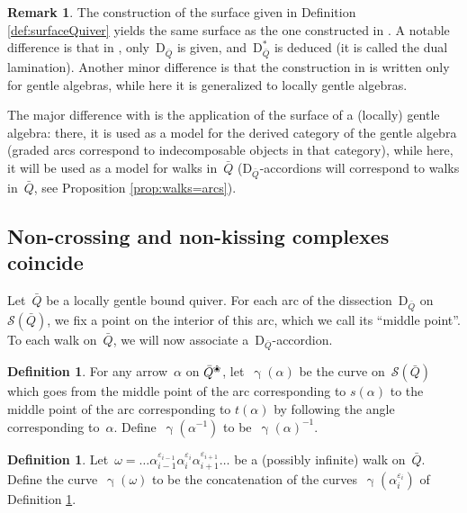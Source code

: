 \documentclass{amsart}
\theoremstyle{definition}
\newtheorem{definition}[theorem]{Definition}
\newtheorem{remark}[theorem]{Remark}
\newcommand{\blossom}{^\text{\ding{96}}} %
\newcommand{\surface}{\mathcal{S}} %
\newcommand{\dual}{^*} %
\newcommand{\dissection}{\mathrm{D}} %
\newcommand{\curveof}{\operatorname{\gamma}} %
\begin{document}
\begin{remark}
\label{rem:comparisonWithOPS}
The construction of the surface given in Definition \ref{def:surfaceQuiver} yields the same surface as the one constructed in \cite{OpperPlamondonSchroll}.
A notable difference is that in \cite{OpperPlamondonSchroll}, only~$\dissection_{\bar Q}$ is given, and~$\dissection_{\bar Q}\dual$ is deduced (it is called the dual lamination).
Another minor difference is that the construction in \cite{OpperPlamondonSchroll} is written only for gentle algebras, while here it is generalized to locally gentle algebras.

The major difference with \cite{OpperPlamondonSchroll} is the application of the surface of a (locally) gentle algebra: 
there, it is used as a model for the derived category of the gentle algebra (graded arcs correspond to indecomposable objects in that category),
while here, it will be used as a model for walks in~$\bar Q$ ($\dissection_{\bar Q}$-accordions will correspond to walks in~$\bar{Q}$, see Proposition \ref{prop:walks=arcs}).
\end{remark}

\subsection{Non-crossing and non-kissing complexes coincide}

Let~$\bar Q$ be a locally gentle bound quiver.
For each arc of the dissection~$\dissection_{\bar Q}$ on~$\surface(\bar Q)$, we fix a point on the interior of this arc, which we call its ``middle point''.
To each walk on~$\bar Q$, we will now associate a~$\dissection_{\bar Q}$-accordion.

\begin{definition}
\label{def:curveOfAnArrow}
For any arrow~$\alpha$ on $\bar Q\blossom$, let~$\curveof(\alpha)$ be the curve on~$\surface(\bar Q)$ which goes from the middle point of the arc corresponding to $s(\alpha)$ to the middle point of the arc corresponding to $t(\alpha)$ by following the angle corresponding to~$\alpha$.
Define~$\curveof(\alpha^{-1})$ to be~$\curveof(\alpha)^{-1}$.
\end{definition}

\begin{definition}
\label{def:curveOfAWalk}
Let~$\omega = \ldots \alpha_{i-1}^{\varepsilon_{i-1}}\alpha_{i}^{\varepsilon_i}\alpha_{i+1}^{\varepsilon_{i+1}} \ldots$ be a (possibly infinite) walk on~$\bar Q$. 
Define the curve~$\curveof(\omega)$ to be the concatenation of the curves~$\curveof(\alpha_i^{\varepsilon_{i}})$ of Definition \ref{def:curveOfAnArrow}.
\end{definition}
\end{document}
